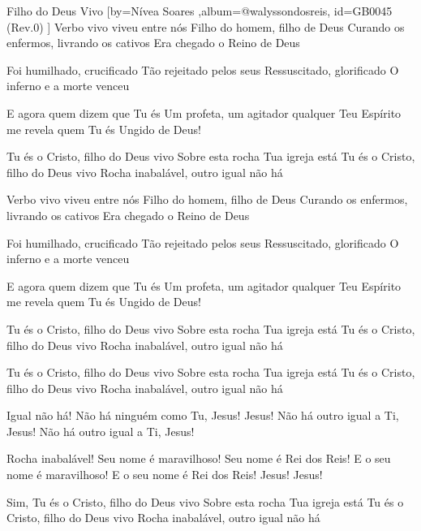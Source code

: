 \beginsong
{Filho do Deus Vivo %
}[by={Nívea Soares %
},album={@walyssondosreis},
id={GB0045 %
(Rev.0) %
}]
Verbo vivo viveu entre nós
Filho do homem, filho de Deus
Curando os enfermos, livrando os cativos
Era chegado o Reino de Deus

Foi humilhado, crucificado
Tão rejeitado pelos seus
Ressuscitado, glorificado
O inferno e a morte venceu

E agora quem dizem que Tu és
Um profeta, um agitador qualquer
Teu Espírito me revela quem Tu és
Ungido de Deus!

Tu és o Cristo, filho do Deus vivo
Sobre esta rocha Tua igreja está
Tu és o Cristo, filho do Deus vivo
Rocha inabalável, outro igual não há

Verbo vivo viveu entre nós
Filho do homem, filho de Deus
Curando os enfermos, livrando os cativos
Era chegado o Reino de Deus

Foi humilhado, crucificado
Tão rejeitado pelos seus
Ressuscitado, glorificado
O inferno e a morte venceu

E agora quem dizem que Tu és
Um profeta, um agitador qualquer
Teu Espírito me revela quem Tu és
Ungido de Deus!

Tu és o Cristo, filho do Deus vivo
Sobre esta rocha Tua igreja está
Tu és o Cristo, filho do Deus vivo
Rocha inabalável, outro igual não há

Tu és o Cristo, filho do Deus vivo
Sobre esta rocha Tua igreja está
Tu és o Cristo, filho do Deus vivo
Rocha inabalável, outro igual não há

Igual não há!
Não há ninguém como Tu, Jesus! Jesus!
Não há outro igual a Ti, Jesus!
Não há outro igual a Ti, Jesus!

Rocha inabalável!
Seu nome é maravilhoso!
Seu nome é Rei dos Reis!
E o seu nome é maravilhoso!
E o seu nome é Rei dos Reis!
Jesus! Jesus!

Sim, Tu és o Cristo, filho do Deus vivo
Sobre esta rocha Tua igreja está
Tu és o Cristo, filho do Deus vivo
Rocha inabalável, outro igual não há


